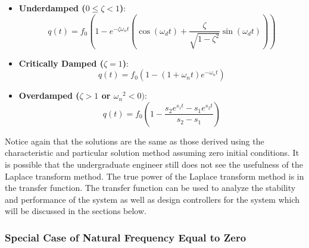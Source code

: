 \begin{itemize}
    \item {\bf Underdamped ($0 \leq \zeta<1$)}:
    \begin{equation}
        q(t) = f_0 \left( 1 - e^{-\zeta \omega_n t} \left( \cos(\omega_d t) + \frac{\zeta}{\sqrt{1-\zeta^2}} \sin(\omega_d t) \right) \right)
    \end{equation}
    \item {\bf Critically Damped ($\zeta=1$)}:
    \begin{equation}
        q(t) = f_0 \left( 1 - (1 + \omega_n t) e^{-\omega_n t} \right)
    \end{equation}
    \item {\bf Overdamped ($\zeta>1$ or ${\omega_n}^2<0)$}:
    \begin{equation}
        q(t) = f_0 \left( 1 - \frac{s_2 e^{s_1 t} - s_1 e^{s_2 t}}{s_2 - s_1} \right)
    \end{equation}
\end{itemize}
Notice again that the solutions are the same as those derived using the characteristic and particular solution method assuming zero initial conditions. It is possible that the undergraduate engineer still does not see the usefulness of the Laplace transform method. The true power of the Laplace transform method is in the transfer function. The transfer function can be used to analyze the stability and performance of the system as well as design controllers for the system which will be discussed in the sections below.

\subsubsection{Special Case of Natural Frequency Equal to Zero}


